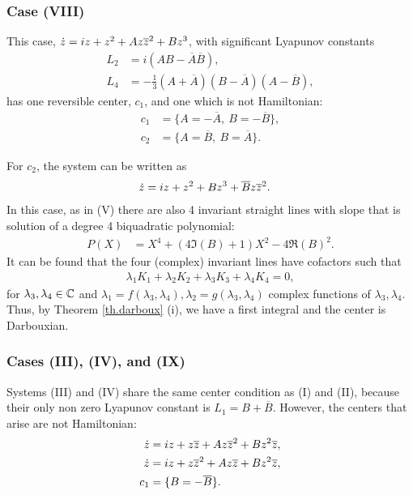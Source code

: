 \subsubsection{Case (VIII)}
This case, $\dot z = iz + z^2+Az\overline{z}^2+Bz^3$, with significant Lyapunov constants
\begin{align*}
L_2&=i(AB-\overline A\overline B),\\
L_4&=-\frac{1}{3}(A+\overline A)(B-\overline A)(A-\overline B),
\end{align*}
has one reversible center, $c_1$, and one which is not Hamiltonian:
\begin{align*}
c_1 &= \{A=-\overline A,~B=-\overline B\},\\
c_2 &= \{A=\overline B,~B=\overline A\}.
\end{align*}

For $c_2$, the system can be written as
\begin{align*}
\dot z &= iz + z^2+Bz^3+\overline Bz\overline{z}^2.
\end{align*}
In this case, as in (V) there are also 4 invariant straight lines with slope that is solution of a degree 4 biquadratic polynomial:
\begin{align*}
P(X)&=X^4+(4\Im(B)+1)X^2-4\Re(B)^2.
\end{align*}
It can be found that the four (complex) invariant lines have cofactors such that
\begin{align*}
\lambda_1K_1+\lambda_2K_2+\lambda_3K_3+\lambda_4K_4=0,
\end{align*}
for $\lambda_{3},\lambda_4\in\mathbb{C}$ and $\lambda_1=f(\lambda_3,\lambda_4),\lambda_2=g(\lambda_3,\lambda_4)$ complex functions of $\lambda_3,\lambda_4$. Thus, by Theorem \ref{th.darboux} (i), we have a first integral and the center is Darbouxian.


\subsubsection{Cases (III), (IV),  and (IX)}
Systems (III) and (IV) share the same center condition as (I) and (II), because their only non zero Lyapunov constant is $L_1=B+\overline B$. However, the centers that arise are not Hamiltonian:
\begin{align*}
\dot z &= iz+z\overline{z}+Az\overline{z}^2+Bz^2\overline{z},\\
\dot z &= iz+z\overline{z}^2+Az\overline{z}+Bz^2\overline{z},\\
c_1 &= \{B=-\overline B\}.
\end{align*}

